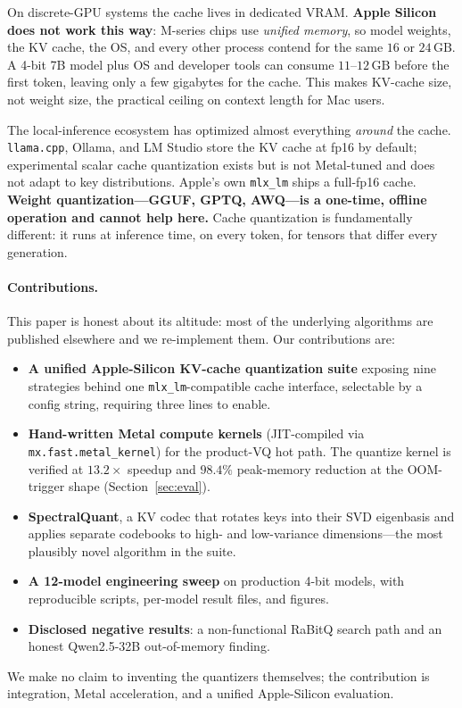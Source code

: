 \documentclass[11pt]{article}
\begin{document}
On discrete-GPU systems the cache lives in dedicated VRAM. \textbf{Apple
Silicon does not work this way}: M-series chips use \emph{unified memory},
so model weights, the KV cache, the OS, and every other process contend for
the same $16$ or $24\,\mathrm{GB}$. A 4-bit 7B model plus OS and developer
tools can consume $11$--$12\,\mathrm{GB}$ before the first token, leaving
only a few gigabytes for the cache. This makes KV-cache size, not weight
size, the practical ceiling on context length for Mac users.

The local-inference ecosystem has optimized almost everything
\emph{around} the cache. \texttt{llama.cpp}, Ollama, and LM Studio store the
KV cache at fp16 by default; experimental scalar cache quantization exists
but is not Metal-tuned and does not adapt to key distributions. Apple's own
\texttt{mlx\_lm} ships a full-fp16 cache. \textbf{Weight quantization---GGUF,
GPTQ, AWQ---is a one-time, offline operation and cannot help here.} Cache
quantization is fundamentally different: it runs at inference time, on every
token, for tensors that differ every generation.

\paragraph{Contributions.} This paper is honest about its altitude: most of
the underlying algorithms are published elsewhere and we re-implement them.
Our contributions are:
\begin{itemize}
  \item \textbf{A unified Apple-Silicon KV-cache quantization suite} exposing
  nine strategies behind one \texttt{mlx\_lm}-compatible cache interface,
  selectable by a config string, requiring three lines to enable.
  \item \textbf{Hand-written Metal compute kernels} (JIT-compiled via
  \texttt{mx.fast.metal\_kernel}) for the product-VQ hot path. The quantize
  kernel is verified at $13.2\times$ speedup and $98.4\%$ peak-memory
  reduction at the OOM-trigger shape (Section~\ref{sec:eval}).
  \item \textbf{SpectralQuant}, a KV codec that rotates keys into their SVD
  eigenbasis and applies separate codebooks to high- and low-variance
  dimensions---the most plausibly novel algorithm in the suite.
  \item \textbf{A 12-model engineering sweep} on production 4-bit models, with
  reproducible scripts, per-model result files, and figures.
  \item \textbf{Disclosed negative results}: a non-functional RaBitQ search
  path and an honest Qwen2.5-32B out-of-memory finding.
\end{itemize}
We make no claim to inventing the quantizers themselves; the contribution is
integration, Metal acceleration, and a unified Apple-Silicon evaluation.
\end{document}
